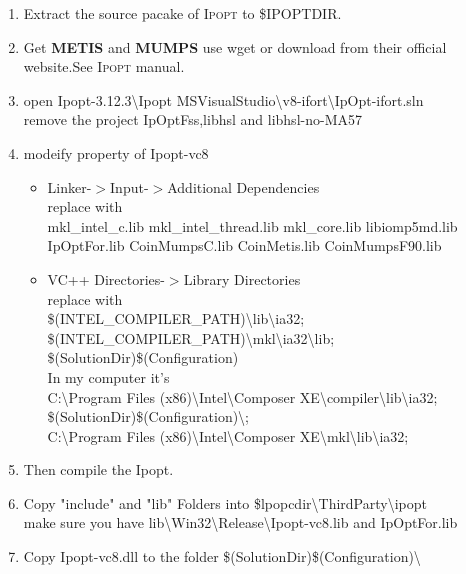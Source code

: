 \documentclass[10pt]{article}
\newcommand{\Ipopt}{\textsc{Ipopt}\xspace}
\begin{document}
  \begin{enumerate}
      \item Extract the source pacake of \Ipopt to \${IPOPTDIR}.
      \item Get \textbf{METIS} and \textbf{MUMPS} use wget or download from their official website.See \Ipopt manual.
      \item open Ipopt-3.12.3\textbackslash Ipopt MSVisualStudio\textbackslash v8-ifort\textbackslash IpOpt-ifort.sln\\
      remove the project IpOptFss,libhsl and libhsl-no-MA57
      \item modeify property of Ipopt-vc8
      \begin{itemize}
      \item Linker-$>$Input-$>$Additional Dependencies\\
      replace with \\
      mkl\_intel\_c.lib mkl\_intel\_thread.lib mkl\_core.lib libiomp5md.lib IpOptFor.lib
      CoinMumpsC.lib
      CoinMetis.lib
      CoinMumpsF90.lib
      \item VC++ Directories-$>$Library Directories\\
      replace with\\ \$(INTEL\_COMPILER\_PATH)\textbackslash lib\textbackslash ia32;\\ \$(INTEL\_COMPILER\_PATH)\textbackslash mkl\textbackslash ia32\textbackslash lib;\\
      \$(SolutionDir)\$(Configuration)\ \\
      In my computer it's\\
      C:\textbackslash Program Files (x86)\textbackslash Intel\textbackslash Composer XE\textbackslash compiler\textbackslash lib\textbackslash ia32;\\
      \$(SolutionDir)\$(Configuration)\textbackslash; \\ C:\textbackslash Program Files (x86)\textbackslash Intel\textbackslash Composer XE\textbackslash mkl\textbackslash lib\textbackslash ia32;
      \end{itemize}
      
      \item Then compile the Ipopt.
      \item Copy "include" and "lib" Folders into \$lpopcdir\textbackslash ThirdParty\textbackslash ipopt\\
      make sure you have lib\textbackslash Win32\textbackslash Release\textbackslash Ipopt-vc8.lib and IpOptFor.lib
      \item  Copy Ipopt-vc8.dll to the folder \$(SolutionDir)\$(Configuration)\textbackslash
  \end{enumerate}
\end{document}
